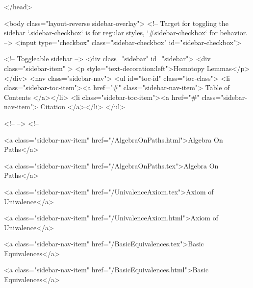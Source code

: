   
</head>




  <body class="layout-reverse sidebar-overlay">
    <!-- Target for toggling the sidebar `.sidebar-checkbox` is for regular
     styles, `#sidebar-checkbox` for behavior. -->
<input type="checkbox" class="sidebar-checkbox" id="sidebar-checkbox">

<!-- Toggleable sidebar -->
<div class="sidebar" id="sidebar">
  <div class="sidebar-item" >
    <p style="text-decoration:left">Homotopy Lemmas</p>
  </div>
  <nav class="sidebar-nav">
    <ul id="toc-id" class="toc-class">
  <li class="sidebar-toc-item"><a href="#" class="sidebar-nav-item"> Table of Contents </a></li>
  <li class="sidebar-toc-item"><a href="#" class="sidebar-nav-item"> Citation </a></li>
</ul>


    <!--  -->
    <!-- 
      
    
      
    
      
    
      
    
      
        
      
    
      
        
          <a class="sidebar-nav-item" href="/AlgebraOnPaths.html">Algebra On Paths</a>
        
      
    
      
        
          <a class="sidebar-nav-item" href="/AlgebraOnPaths.tex">Algebra On Paths</a>
        
      
    
      
        
          <a class="sidebar-nav-item" href="/UnivalenceAxiom.tex">Axiom of Univalence</a>
        
      
    
      
        
          <a class="sidebar-nav-item" href="/UnivalenceAxiom.html">Axiom of Univalence</a>
        
      
    
      
        
          <a class="sidebar-nav-item" href="/BasicEquivalences.tex">Basic Equivalences</a>
        
      
    
      
        
          <a class="sidebar-nav-item" href="/BasicEquivalences.html">Basic Equivalences</a>
        
